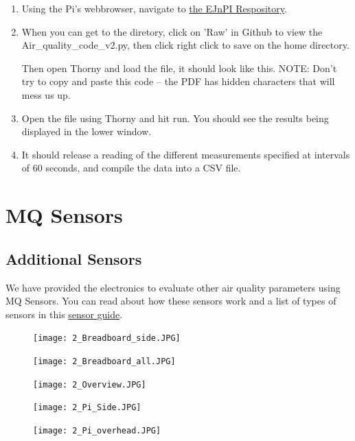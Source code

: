 \documentclass{article}
\begin{document}
\begin{enumerate}

\item Using the Pi's webbrowser, navigate to \href{https://github.com/marclos/EJnPi/tree/master/code}{the EJnPI Respository}. 

\item When you can get to the diretory, click on 'Raw' in Github to view the Air\_quality\_code\_v2.py, then click right click to save on the home directory.

Then open Thorny and load the file, it should look like this. NOTE: Don't try to copy and paste this code -- the PDF has hidden characters that will mess us up.



\item Open the file using Thorny and hit run. You should see the results being displayed in the lower window.



\item It should release a reading of the different measurements specified at intervals of 60 seconds, and compile the data into a CSV file.

\end{enumerate}
\clearpage

\section{MQ Sensors}

\subsection{Additional Sensors}

We have provided the electronics to evaluate other air quality parameters using MQ Sensors. You can read about how these sensors work and a list of types of sensors in this \href{http://github...}{sensor guide}.

\begin{figure}
\texttt{[image: 2\_Breadboard\_side.JPG]}
\end{figure}

\begin{figure}
\texttt{[image: 2\_Breadboard\_all.JPG]}
\end{figure}

\begin{figure}
\texttt{[image: 2\_Overview.JPG]}
\end{figure}

\begin{figure}
\texttt{[image: 2\_Pi\_Side.JPG]}
\end{figure}

\begin{figure}
\texttt{[image: 2\_Pi\_overhead.JPG]}
\end{figure}
\end{document}
